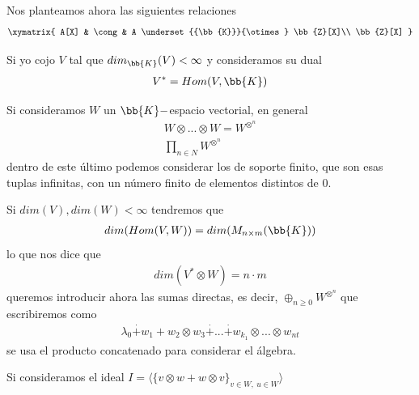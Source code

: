 \begin{ejemplo}
\begin{itemize}

        Nos planteamos ahora las siguientes relaciones
        \begin{gather*}
            \xymatrix{
                A[X] & \cong & A \underset{{\bb{K}}}{\otimes}  \bb{Z}[X]\\
                \bb{Z}[X]
            }
        \end{gather*}


        Si yo cojo $V$ tal que $dim_{\bb{K}}(V)<\infty$ y consideramos su dual
        \begin{gather*}
            V^* = Hom(V, \bb{K})
        \end{gather*}
    \end{itemize}
\end{ejemplo}




Si consideramos $W$ un $\bb{K}-$espacio vectorial, en general
\begin{gather*}
    W \otimes ... \otimes W = W^{\otimes^n}\\
    \prod_{n\in N} W^{\otimes^n}
\end{gather*}
dentro de este último podemos considerar los de soporte finito, que son esas tuplas infinitas, con un número finito de elementos distintos de $0$.

Si $dim(V), dim(W) < \infty$ tendremos que 
\begin{gather*}
    dim(Hom(V,W)) = dim(M_{n\times m}(\bb{K}))
\end{gather*}
lo que nos dice que 
\begin{gather*}
    dim(V^*\otimes W) = n\cdot m
\end{gather*}
queremos introducir ahora las sumas directas, es decir, $\oplus_{n\geq 0} W^{\otimes^n}$ que escribiremos como
\begin{gather*}
    \lambda_0 \overset{\cdot}{+} w_1 + w_2 \otimes w_3 \overset{\cdot}{+} ... \overset{\cdot}{+} w_{k_1} \otimes ... \otimes w_{nt}
\end{gather*}
se usa el producto concatenado para considerar el álgebra.

Si consideramos el ideal $I = \langle \{ v \otimes w + w \otimes v \}_{v\in W,\ u\in W} \rangle$

